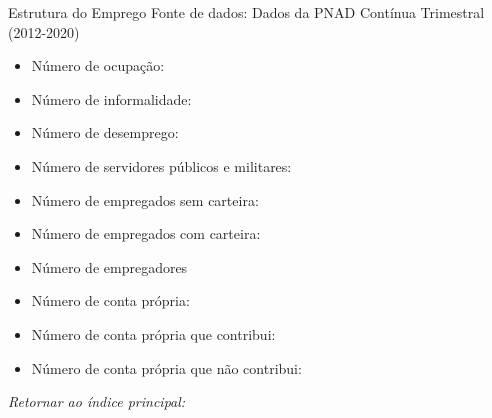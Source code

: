 \begin{frame}[label=_estrutura_emprego]{Estrutura do Emprego}
{\footnotesize Fonte de dados: Dados da PNAD Contínua Trimestral (2012-2020)}
\begin{itemize}
\item{Número de ocupação: \hyperlink{_estrutura_emprego_n_de_ocupacao}{}}
\item{Número de informalidade: \hyperlink{_estrutura_emprego_n_de_informalidade}{}}
\item{Número de desemprego: \hyperlink{_estrutura_emprego_n_de_desemprego}{}}
\item{Número de servidores públicos e militares: \hyperlink{_estrutura_emprego_n_militar}{}}
\item{Número de empregados sem carteira: \hyperlink{_estrutura_emprego_n_empregadoSC}{}}
\item{Número de empregados com carteira: \hyperlink{_estrutura_emprego_n_empregadoCC}{}}
\item{Número de empregadores \hyperlink{_estrutura_emprego_n_empregador}{}}
\item{Número de conta própria: \hyperlink{_estrutura_emprego_n_cpropria}{}}
\item{Número de conta própria que contribui: \hyperlink{_estrutura_emprego_n_cpropriaC}{}}
\item{Número de conta própria que não contribui: \hyperlink{_estrutura_emprego_n_cpropriaNc}{}}
\end{itemize}

\begin{small}
\textit{Retornar ao índice principal: \hyperlink{indice_principal}{} }
\end{small}

\end{frame}

